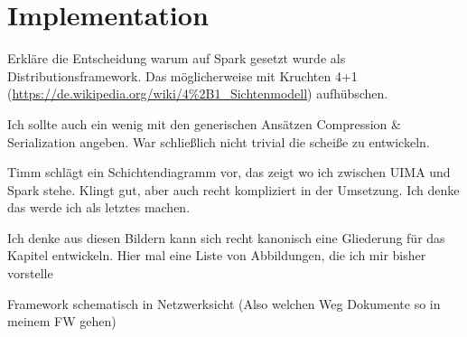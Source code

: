 \chapter{Implementation}

Erkläre die Entscheidung warum auf Spark gesetzt wurde als Distributionsframework. Das möglicherweise mit Kruchten 4+1 (\url{https://de.wikipedia.org/wiki/4\%2B1_Sichtenmodell})  aufhübschen.

Ich sollte auch ein wenig mit den generischen Ansätzen Compression \& Serialization angeben. War schließlich nicht trivial die scheiße zu entwickeln.

Timm schlägt ein Schichtendiagramm vor, das zeigt wo ich zwischen UIMA und Spark stehe. Klingt gut, aber auch recht kompliziert in der Umsetzung. Ich denke das werde ich als letztes machen.

Ich denke aus diesen Bildern kann sich recht kanonisch eine Gliederung für das Kapitel entwickeln. Hier mal eine Liste von Abbildungen, die ich mir bisher vorstelle

Framework schematisch in Netzwerksicht (Also welchen Weg Dokumente so in meinem FW gehen)


